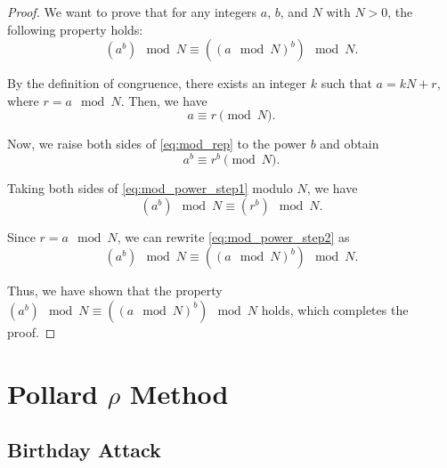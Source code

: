\documentclass[12pt,openany]{book}
\begin{document}
	\begin{proof}
		We want to prove that for any integers $a$, $b$, and $N$ with $N > 0$, the following property holds:
		\begin{equation} \label{eq:mod_power}
		(a^b) \mod N \equiv ((a \mod N)^b) \mod N.
		\end{equation}
		
		By the definition of congruence, there exists an integer $k$ such that $a = kN + r$, where $r = a \mod N$. Then, we have
		\begin{equation} \label{eq:mod_rep}
		a \equiv r \pmod{N}.
		\end{equation}
		
		Now, we raise both sides of \eqref{eq:mod_rep} to the power $b$ and obtain
		\begin{equation} \label{eq:mod_power_step1}
		a^b \equiv r^b \pmod{N}.
		\end{equation}
		
		Taking both sides of \eqref{eq:mod_power_step1} modulo $N$, we have
		\begin{equation} \label{eq:mod_power_step2}
		(a^b) \mod N \equiv (r^b) \mod N.
		\end{equation}
		
		Since $r = a \mod N$, we can rewrite \eqref{eq:mod_power_step2} as
		\begin{equation} \label{eq:mod_power_step3}
		(a^b) \mod N \equiv ((a \mod N)^b) \mod N.
		\end{equation}
		
		Thus, we have shown that the property $(a^b) \mod N \equiv ((a \mod N)^b) \mod N$ holds, which completes the proof.
	\end{proof}


	\chapter{Pollard $\rho$ Method}
	\section{Birthday Attack}
\end{document}
